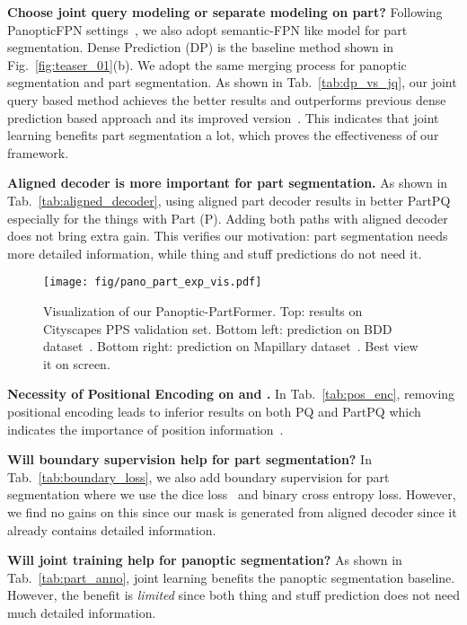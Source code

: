 \noindent
\textbf{Choose joint query modeling or separate modeling on part?} Following PanopticFPN settings~\cite{kirillov2019panopticfpn}, we also adopt semantic-FPN like model for part segmentation. Dense Prediction (DP) is the baseline method shown in Fig.~\ref{fig:teaser_01}(b). We adopt the same merging process for panoptic segmentation and part segmentation. As shown in Tab.~\ref{tab:dp_vs_jq}, our joint query based method achieves the better results and outperforms previous dense prediction based approach and its improved version~\cite{deeplabv3}. This indicates that joint learning benefits part segmentation a lot, which proves the effectiveness of our framework.  

\noindent
\textbf{Aligned decoder is more important for part segmentation.} As shown in Tab.~\ref{tab:aligned_decoder}, using aligned part decoder results in better PartPQ especially for the things with Part (P). Adding both paths with aligned decoder does not bring extra gain. This verifies our motivation: part segmentation needs more detailed information, while thing and stuff predictions do not need it.


\begin{figure*}[t!]
	\centering
	\texttt{[image: fig/pano\_part\_exp\_vis.pdf]}
	\caption{\small Visualization of our Panoptic-PartFormer. Top: results on Cityscapes PPS validation set. Bottom left: prediction on BDD dataset~\cite{yu2020bdd100k}. Bottom right: prediction on Mapillary dataset~\cite{neuhold2017mapillary}. Best view it on screen. }
	\label{fig:exp_vis}
\end{figure*}



\noindent
\textbf{Necessity of Positional Encoding on  and .} 
In Tab.~\ref{tab:pos_enc}, removing positional encoding leads to inferior results on both PQ and PartPQ which indicates the importance of position information~\cite{wang2020solov2,zhang2021knet,detr}.

\noindent
\textbf{Will boundary supervision help for part segmentation?} In Tab.~\ref{tab:boundary_loss}, we also add boundary supervision for part segmentation where we use the dice loss~\cite{milletari2016v} and binary cross entropy loss. However, we find no gains on this since our mask is generated from aligned decoder since it already contains detailed information.


\noindent
\textbf{Will joint training help for panoptic segmentation?} As shown in Tab.~\ref{tab:part_anno}, joint learning benefits the panoptic segmentation baseline. However, the benefit is \textit{limited} since both thing and stuff prediction does not need much detailed information. 

